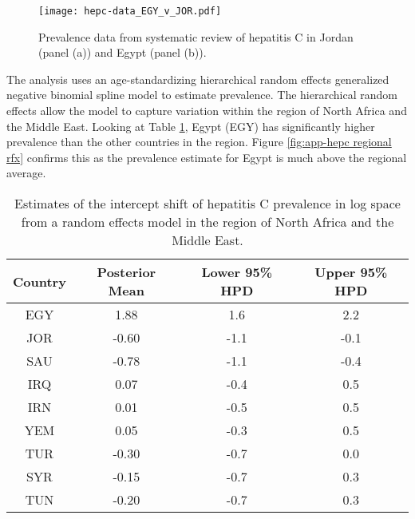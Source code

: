     \begin{figure}[h]
        \begin{center}
            \texttt{[image: hepc-data\_EGY\_v\_JOR.pdf]}
            \caption{Prevalence data from systematic review of hepatitis C in Jordan (panel (a)) and Egypt (panel (b)).}
            \label{fig:app-hepc data}
        \end{center}
    \end{figure}

The analysis uses an age-standardizing hierarchical random effects generalized negative binomial spline model to estimate prevalence.  The hierarchical random effects allow the model to capture variation within the region of North Africa and the Middle East.  Looking at Table \ref{tab:app-hepc regional rfx}, Egypt (EGY) has significantly higher prevalence than the other countries in the region.  Figure \ref{fig:app-hepc regional rfx} confirms this as the prevalence estimate for Egypt is much above the regional average.

    \begin{table}[h]
        \begin{center}
        \caption{ Estimates of the intercept shift of hepatitis C prevalence in log space from a random effects model in the region of North Africa and the Middle East.}
        \label{tab:app-hepc regional rfx}
        \begin{tabular}{|c|c|c|c|}
            \hline
                Country & Posterior Mean & Lower 95\% HPD  & Upper 95\%  HPD \\
            \hline
                EGY	&	1.88	&	 1.6	&	2.2	\\
                JOR	&	-0.60	&	-1.1	&	-0.1 \\
                SAU	&	-0.78	&	-1.1	&	-0.4 \\
                IRQ	&	0.07	&	-0.4	&	0.5	\\
                IRN	&	0.01	&	-0.5	&	0.5	\\
                YEM	&	0.05	&	-0.3	&	0.5	\\
                TUR	&	-0.30	&	-0.7	&	0.0	\\
                SYR	&	-0.15	&	-0.7	&	0.3	\\
                TUN	&	-0.20	&	-0.7	&	0.3	\\
            \hline
        \end{tabular}
        \end{center}
    \end{table}

